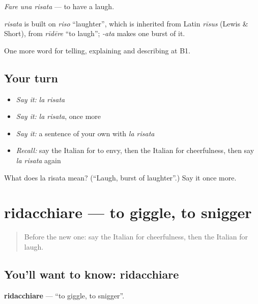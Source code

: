 \emph{Fare una risata} — to have a laugh.

\begin{cousinweb}
\emph{risata} is built on \emph{riso} \textquotedblleft{}laughter\textquotedblright{}, which is inherited from Latin \emph{rīsus} (Lewis \& Short), from \emph{rīdēre} \textquotedblleft{}to laugh\textquotedblright{}; \emph{-ata} makes one burst of it.
\end{cousinweb}

\begin{grammarlens}[title={What you've built}]
One more word for telling, explaining and describing at B1.
\end{grammarlens}

\subsection*{Your turn}
\begin{itemize}
\raggedright
  \item \emph{Say it:} \emph{la risata}
  \item \emph{Say it:} \emph{la risata}, once more
  \item \emph{Say it:} a sentence of your own with \emph{la risata}
  \item \emph{Recall:} say the Italian for to envy, then the Italian for cheerfulness, then say \emph{la risata} again
\end{itemize}

\begin{tcolorbox}[breakable,colback=teal!4,colframe=teal!35!black,title={Before you move on}]
What does la risata mean? (\textquotedblleft{}Laugh, burst of laughter\textquotedblright{}.) Say it once more.
\end{tcolorbox}
\section[ridacchiare]{ridacchiare — to giggle, to snigger}

\label{lesson:IT-C479-ridacchiare}



\begin{quote}
Before the new one: say the Italian for cheerfulness, then the Italian for laugh.
\end{quote}

\subsection*{You'll want to know: ridacchiare}
\textbf{ridacchiare} — \textquotedblleft{}to giggle, to snigger\textquotedblright{}.

